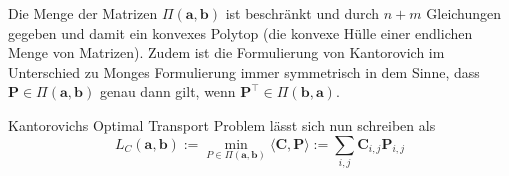 \documentclass[11pt,a4paper]{article}
\numberwithin{equation}{section}
\begin{document}
	Die Menge der Matrizen $\Pi(\boldsymbol{a}, \boldsymbol{b})$ ist beschränkt und durch $n+m$ Gleichungen gegeben und damit ein konvexes Polytop (die konvexe Hülle einer endlichen Menge von Matrizen). Zudem ist die Formulierung von Kantorovich im Unterschied zu Monges Formulierung immer symmetrisch in dem Sinne, dass $\boldsymbol{P} \in \Pi (\boldsymbol{a}, \boldsymbol{b})$ genau dann gilt, wenn $\boldsymbol{P}^\top \in \Pi (\boldsymbol{b}, \boldsymbol{a})$.
	
	Kantorovichs Optimal Transport Problem lässt sich nun schreiben als 
	\begin{equation}
	L_C(\boldsymbol{a}, \boldsymbol{b}) := \min_{P \in \Pi(\boldsymbol{a}, \boldsymbol{b})} \langle \boldsymbol{C}, \boldsymbol{P} \rangle := \sum_{i,j}{\boldsymbol{C}_{i,j}\boldsymbol{P}_{i,j}} \label{KOTP}
	\end{equation}
	
\end{document}
